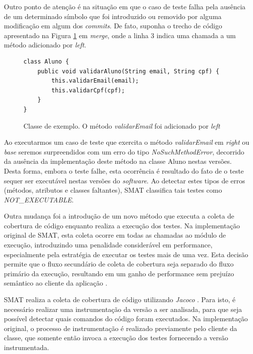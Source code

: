 \documentclass[12pt]{article}
\begin{document}
Outro ponto de atenção é na situação em que o caso de teste falha pela ausência de um determinado símbolo que foi introduzido ou removido por alguma modificação em algum dos \textit{commits}. De fato, suponha o trecho de código apresentado na Figura \ref{fig:not_executable} em \textit{merge}, onde a linha 3 indica uma chamada a um método adicionado por \textit{left}. 

\begin{figure}[H]
\begin{verbatim}
class Aluno {
    public void validarAluno(String email, String cpf) {
        this.validarEmail(email);
        this.validarCpf(cpf);
    }
}
\end{verbatim}
\caption{Classe de exemplo. O método \textit{validarEmail} foi adicionado por \textit{left}}
\label{fig:not_executable}
\end{figure}

Ao executarmos um caso de teste que exercita o método \textit{validarEmail} em \textit{right} ou \textit{base} seremos surpreendidos com um erro do tipo \textit{NoSuchMethodError}, decorrido da ausência da implementação deste método na classe Aluno nestas versões. Desta forma, embora o teste falhe, esta ocorrência é resultado do fato de o teste sequer ser executável nestas versões do \textit{software}. Ao detectar estes tipos de erros (métodos, atributos e classes faltantes), SMAT classifica tais testes como \textit{NOT\_EXECUTABLE}.

Outra mudança foi a introdução de um novo método que executa a coleta de cobertura de código enquanto realiza a execução dos testes. Na implementação original de SMAT, esta coleta ocorre em todas as chamadas ao módulo de execução, introduzindo uma penalidade considerável em performance, especialmente pela estratégia de executar os testes mais de uma vez. Esta decisão permite que o fluxo secundário de coleta de cobertura seja separado do fluxo primário da execução, resultando em um ganho de performance sem prejuízo semântico ao cliente da aplicação \cite{ousterhout2018philosophy}.

SMAT realiza a coleta de cobertura de código utilizando \textit{Jacoco} \cite{jacoco}. Para isto, é necessário realizar uma instrumentação da versão a ser analisada, para que seja possível detectar quais comandos do código foram executados. Na implementação original, o processo de instrumentação é realizado previamente pelo cliente da classe, que somente então invoca a execução dos testes fornecendo a versão instrumentada.
\end{document}
